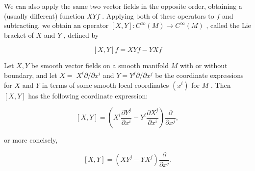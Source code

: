 \begin{definition}
\label{def:8-59-extra-1}
\mathlibok
We can also apply the same two vector fields in the opposite order, obtaining a (usually different) function ${XYf}$ . Applying both of these operators to $f$ and subtracting, we obtain an operator $\left\lbrack  {X, Y}\right\rbrack   : {C}^{\infty }\left( M\right)  \rightarrow  {C}^{\infty }\left( M\right)$ , called the Lie bracket of $X$ and $Y$ , defined by

\[
\left\lbrack  {X, Y}\right\rbrack  f = {XYf} - {YXf}
\]
\end{definition}

\begin{proposition}
\label{prop:8-26}
\leanok
{}
Let $X, Y$ be smooth vector fields on a smooth manifold $M$ with or without boundary, and let $X = \; {X}^{i}\partial /\partial {x}^{i}$ and $Y = {Y}^{j}\partial /\partial {x}^{j}$ be the coordinate expressions for $X$ and $Y$ in terms of some smooth local coordinates $\left( {x}^{i}\right)$ for $M$ . Then $\left\lbrack  {X, Y}\right\rbrack$ has the following coordinate expression:

\[
\left\lbrack  {X, Y}\right\rbrack   = \left( {{X}^{i}\frac{\partial {Y}^{j}}{\partial {x}^{i}} - {Y}^{i}\frac{\partial {X}^{j}}{\partial {x}^{i}}}\right) \frac{\partial }{\partial {x}^{j}}, \tag{8.8}
\]

or more concisely,

\[
\left\lbrack  {X, Y}\right\rbrack   = \left( {X{Y}^{j} - Y{X}^{j}}\right) \frac{\partial }{\partial {x}^{j}}. \tag{8.9}
\]
\end{proposition}


